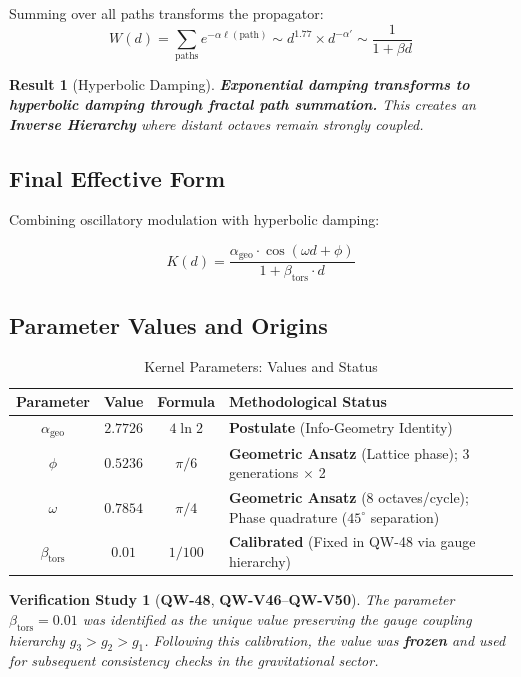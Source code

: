 \documentclass[11pt,a4paper]{book}
\newtheorem{verification}{Verification Study}[section]
\newtheorem{result}{Result}[section]
\theoremstyle{remark}
\newcommand{\Kd}{K(d)}
\newcommand{\alphageo}{\alpha_{\text{geo}}}
\newcommand{\betators}{\beta_{\text{tors}}}
\newcommand{\QW}[1]{\textbf{QW-#1}}
\begin{document}
Summing over all paths transforms the propagator:
\begin{equation}
W(d) = \sum_{\text{paths}} e^{-\alpha \ell(\text{path})} \sim d^{1.77} \times d^{-\alpha'} \sim \frac{1}{1 + \beta d}
\end{equation}

\begin{result}[Hyperbolic Damping]
\textbf{Exponential damping transforms to hyperbolic damping through fractal path summation.} This creates an \textbf{Inverse Hierarchy} where distant octaves remain strongly coupled.
\end{result}

\subsection{Final Effective Form}

Combining oscillatory modulation with hyperbolic damping:

\begin{equation}
\boxed{
\Kd = \frac{\alphageo \cdot \cos(\omega d + \phi)}{1 + \betators \cdot d}
}
\label{eq:kernel}
\end{equation}

\subsection{Parameter Values and Origins}

\begin{table}[H]
\centering
\caption{Kernel Parameters: Values and Status}
\begin{tabular}{|c|c|c|p{6cm}|}
\hline
\textbf{Parameter} & \textbf{Value} & \textbf{Formula} & \textbf{Methodological Status} \\
\hline
$\alphageo$ & $2.7726$ & $4 \ln 2$ & \textbf{Postulate} (Info-Geometry Identity) \\
\hline
$\phi$ & $0.5236$ & $\pi/6$ & \textbf{Geometric Ansatz} (Lattice phase); 3 generations $\times$ 2 \\
\hline
$\omega$ & $0.7854$ & $\pi/4$ & \textbf{Geometric Ansatz} (8 octaves/cycle); Phase quadrature ($45^\circ$ separation) \\
\hline
$\betators$ & $0.01$ & $1/100$ & \textbf{Calibrated} (Fixed in QW-48 via gauge hierarchy) \\
\hline
\end{tabular}
\end{table}

\begin{verification}[\QW{48}, \QW{V46}--\QW{V50}]
The parameter $\betators = 0.01$ was identified as the unique value preserving the gauge coupling hierarchy $g_3 > g_2 > g_1$. Following this calibration, the value was \textbf{frozen} and used for subsequent consistency checks in the gravitational sector.
\end{verification}
\end{document}
